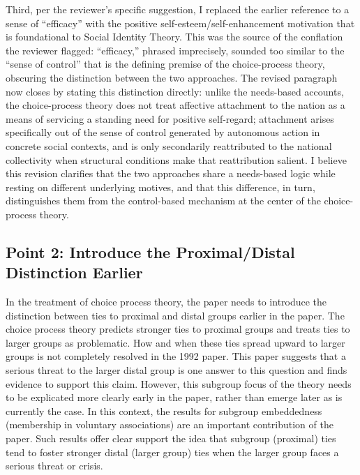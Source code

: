 \documentclass[11pt]{article}
\begin{document}
Third, per the reviewer's specific suggestion, I replaced the earlier reference to a sense of ``efficacy'' with the positive self-esteem/self-enhancement motivation that is foundational to Social Identity Theory. This was the source of the conflation the reviewer flagged: ``efficacy,'' phrased imprecisely, sounded too similar to the ``sense of control'' that is the defining premise of the choice-process theory, obscuring the distinction between the two approaches. The revised paragraph now closes by stating this distinction directly: unlike the needs-based accounts, the choice-process theory does not treat affective attachment to the nation as a means of servicing a standing need for positive self-regard; attachment arises specifically out of the sense of control generated by autonomous action in concrete social contexts, and is only secondarily reattributed to the national collectivity when structural conditions make that reattribution salient. I believe this revision clarifies that the two approaches share a needs-based logic while resting on different underlying motives, and that this difference, in turn, distinguishes them from the control-based mechanism at the center of the choice-process theory.

\subsection*{Point 2: Introduce the Proximal/Distal Distinction Earlier}

\begin{reviewercomment}
In the treatment of choice process theory, the paper needs to introduce the distinction between ties to proximal and distal groups earlier in the paper. The choice process theory predicts stronger ties to proximal groups and treats ties to larger groups as problematic. How and when these ties spread upward to larger groups is not completely resolved in the 1992 paper. This paper suggests that a serious threat to the larger distal group is one answer to this question and finds evidence to support this claim. However, this subgroup focus of the theory needs to be explicated more clearly early in the paper, rather than emerge later as is currently the case. In this context, the results for subgroup embeddedness (membership in voluntary associations) are an important contribution of the paper. Such results offer clear support the idea that subgroup (proximal) ties tend to foster stronger distal (larger group) ties when the larger group faces a serious threat or crisis.
\end{reviewercomment}
\end{document}
